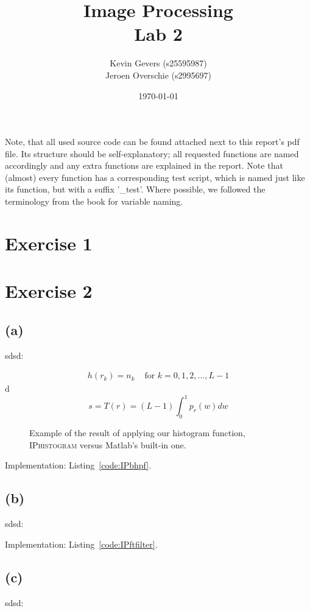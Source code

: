 \documentclass{article}
\title{Image Processing\\
    Lab 2}
\author{Kevin Gevers (s25595987) \\ Jeroen Overschie (s2995697)}
\date{\today}
\begin{document}
\maketitle

Note, that all used source code can be found attached next to this report's pdf file. Its structure should be self-explanatory; all requested functions are named accordingly and any extra functions are explained in the report. Note that (almost) every function has a corresponding test script, which is named just like its function, but with a suffix '\_test'. Where possible, we followed the terminology from the book \citep{gonzalez2008digital} for variable naming.

\section*{Exercise 1}

\section*{Exercise 2}
\subsection*{(a)} sdsd:

\[
\begin{aligned}
h(r_k)=n_k & \text{ for $k=0,1,2,...,L-1$}
\end{aligned}
\]
d
\[
s=T(r)=(L-1)\int_{0}^{1} p_r(w)dw
\]
\begin{figure}[ht]
    \centering
    
    \caption{Example of the result of applying our histogram function, \textsc{IPhistogram} versus Matlab's built-in one.}
    \label{fig:histogram}
\end{figure}

 Implementation: Listing~\ref{code:IPbhpf}.
\subsection*{(b)} sdsd:

 Implementation: Listing~\ref{code:IPftfilter}.
\subsection*{(c)} sdsd:


\typeout{}

\end{document}
